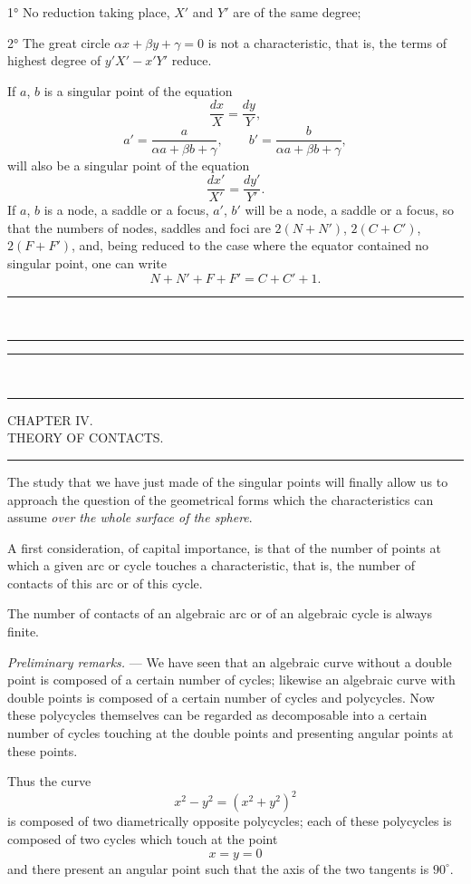 \documentclass[11pt]{article}
\newcommand{\ornament}{\begin{center}\rule{2.5em}{0.4pt}\,\raisebox{0.1ex}{\tiny$\bullet\bullet\bullet$}\,\rule{2.5em}{0.4pt}\end{center}}
\newcommand{\shortline}{\begin{center}\rule{3.5em}{0.4pt}\end{center}}
\begin{document}
1° No reduction taking place, $X'$ and $Y'$ are of the same degree;

2° The great circle $\alpha x+\beta y+\gamma=0$ is not a characteristic, that is, the terms of highest degree of $y'X'-x'Y'$ reduce.

If $a$, $b$ is a singular point of the equation
\[
\frac{dx}{X}=\frac{dy}{Y},
\]
\[
a'=\frac{a}{\alpha a+\beta b+\gamma},
\qquad
b'=\frac{b}{\alpha a+\beta b+\gamma},
\]
will also be a singular point of the equation
\[
\frac{dx'}{X'}=\frac{dy'}{Y'}.
\]
If $a$, $b$ is a node, a saddle or a focus, $a'$, $b'$ will be a node, a saddle or a focus, so that the numbers of nodes, saddles and foci are $2(N+N')$, $2(C+C')$, $2(F+F')$, and, being reduced to the case where the equator contained no singular point, one can write
\[
N+N'+F+F'=C+C'+1.
\]

\ornament



\ornament
\begin{center}
{\Large CHAPTER IV.}\\[0.4em]
{\small THEORY OF CONTACTS.}
\end{center}
\shortline

The study that we have just made of the singular points will finally allow us to approach the question of the geometrical forms which the characteristics can assume \emph{over the whole surface of the sphere}.

A first consideration, of capital importance, is that of the number of points at which a given arc or cycle touches a characteristic, that is, the number of contacts of this arc or of this cycle.

The number of contacts of an algebraic arc or of an algebraic cycle is always finite.

\emph{Preliminary remarks.} --- We have seen that an algebraic curve without a double point is composed of a certain number of cycles; likewise an algebraic curve with double points is composed of a certain number of cycles and polycycles. Now these polycycles themselves can be regarded as decomposable into a certain number of cycles touching at the double points and presenting angular points at these points.

Thus the curve
\[
x^2-y^2=(x^2+y^2)^2
\]
is composed of two diametrically opposite polycycles; each of these polycycles is composed of two cycles which touch at the point
\[
x=y=0
\]
and there present an angular point such that the axis of the two tangents is $90^\circ$.
\end{document}
